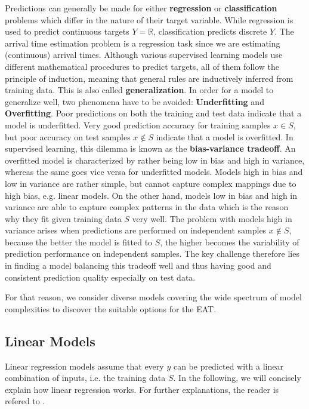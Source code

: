 Predictions can generally be made for either \textbf{regression} or \textbf{classification} problems which differ in the nature of their target variable. 
While regression is used to predict continuous targets $ Y = \mathbb{R} $, classification predicts discrete $ Y $. The arrival time estimation problem is a regression task since we are estimating (continuous) arrival times.
Although various supervised learning models use different mathematical procedures to predict targets, all of them follow the principle of induction, meaning that general rules are inductively inferred from training data. This is also called \textbf{generalization}.  
In order for a model to generalize well, two phenomena have to be avoided: \textbf{Underfitting} and \textbf{Overfitting}. 
Poor predictions on both the training and test data indicate that a model is underfitted. Very good prediction accuracy for training samples $ x \in S $, but poor accuracy on test samples $ x \notin S $ indicate that a model is overfitted.
In supervised learning, this dilemma is known as the \textbf{bias-variance tradeoff}. 
An overfitted model is characterized by rather being low in bias and high in variance, whereas the same goes vice versa for underfitted models. Models high in bias and low in variance are rather simple, but cannot capture complex mappings due to high bias, e.g. linear models. On the other hand, models low in bias and high in variance are able to capture complex patterns in the data which is the reason why they fit given training data $ S $ very well. The problem with models high in variance arises when predictions are performed on independent samples $ x \notin S $, because the better the model is fitted to $ S $, the higher becomes the variability of prediction performance on independent samples. 
The key challenge therefore lies in finding a model balancing this tradeoff well and thus having good and consistent prediction quality especially on test data.

For that reason, we consider diverse models covering the wide spectrum of model complexities to discover the suitable options for the EAT. 
 
\subsection{Linear Models}

Linear regression models assume that every $ y $ can be predicted with a linear combination of inputs, i.e. the training data $ S $. In the following, we will concisely explain how linear regression works. For further explanations, the reader is refered to \cite{friedman2001elements}.

